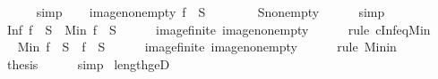 \begin{isabellebody}
\ \ \ \ \isamarkupfalse%
\ simp\isanewline
\ \ \isamarkupfalse%
\ image{\isacharunderscore}{\kern0pt}non{\isacharunderscore}{\kern0pt}empty{\isacharcolon}{\kern0pt}\ {\isachardoublequoteopen}{\isacharparenleft}{\kern0pt}f\ {\isacharbackquote}{\kern0pt}\ S{\isacharparenright}{\kern0pt}\ {\isasymnoteq}\ {\isacharbraceleft}{\kern0pt}{\isacharbraceright}{\kern0pt}{\isachardoublequoteclose}\isanewline
\ \ \ \ \isamarkupfalse%
\ S{\isacharunderscore}{\kern0pt}non{\isacharunderscore}{\kern0pt}empty\isanewline
\ \ \ \ \isamarkupfalse%
\ simp\isanewline
\isanewline
\ \ \isamarkupfalse%
\ {\isachardoublequoteopen}Inf\ {\isacharparenleft}{\kern0pt}f\ {\isacharbackquote}{\kern0pt}\ S{\isacharparenright}{\kern0pt}\ {\isacharequal}{\kern0pt}\ Min\ {\isacharparenleft}{\kern0pt}f\ {\isacharbackquote}{\kern0pt}\ S{\isacharparenright}{\kern0pt}{\isachardoublequoteclose}\isanewline
\ \ \ \ \isamarkupfalse%
\ image{\isacharunderscore}{\kern0pt}finite\ image{\isacharunderscore}{\kern0pt}non{\isacharunderscore}{\kern0pt}empty\isanewline
\ \ \ \ \isamarkupfalse%
\ {\isacharparenleft}{\kern0pt}rule\ cInf{\isacharunderscore}{\kern0pt}eq{\isacharunderscore}{\kern0pt}Min{\isacharparenright}{\kern0pt}\isanewline
\ \ \isamarkupfalse%
\ \isamarkupfalse%
\ {\isachardoublequoteopen}Min\ {\isacharparenleft}{\kern0pt}f\ {\isacharbackquote}{\kern0pt}\ S{\isacharparenright}{\kern0pt}\ {\isasymin}\ {\isacharparenleft}{\kern0pt}f\ {\isacharbackquote}{\kern0pt}\ S{\isacharparenright}{\kern0pt}{\isachardoublequoteclose}\isanewline
\ \ \ \ \isamarkupfalse%
\ image{\isacharunderscore}{\kern0pt}finite\ image{\isacharunderscore}{\kern0pt}non{\isacharunderscore}{\kern0pt}empty\isanewline
\ \ \ \ \isamarkupfalse%
\ {\isacharparenleft}{\kern0pt}rule\ Min{\isacharunderscore}{\kern0pt}in{\isacharparenright}{\kern0pt}\isanewline
\ \ \isamarkupfalse%
\ \isamarkupfalse%
\ {\isacharquery}{\kern0pt}thesis\isanewline
\ \ \ \ \isamarkupfalse%
\ simp\isanewline
{}\isamarkupfalse%
%
\endisatagproof
{\isafoldproof}%
%
\isadelimproof
%
\endisadelimproof
%
\isadeliminvisible
%
\endisadeliminvisible
%
\isataginvisible
%
\isamarkuptrue%
%
\isamarkuptrue%
\isamarkupfalse%
\ length{\isacharunderscore}{\kern0pt}ge{\isacharunderscore}{\kern0pt}{}D{\isacharcolon}{\kern0pt}\isanewline

\end{isabellebody}
